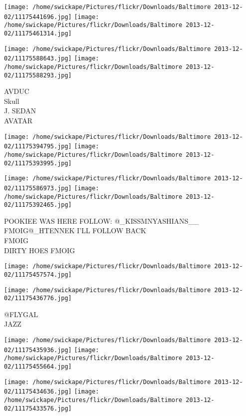 \documentclass[10pt,letterpaper]{article}
\begin{document}
\texttt{[image: /home/swickape/Pictures/flickr/Downloads/Baltimore 2013-12-02/11175441696.jpg]}
\texttt{[image: /home/swickape/Pictures/flickr/Downloads/Baltimore 2013-12-02/11175461314.jpg]}

\texttt{[image: /home/swickape/Pictures/flickr/Downloads/Baltimore 2013-12-02/11175588643.jpg]}
\texttt{[image: /home/swickape/Pictures/flickr/Downloads/Baltimore 2013-12-02/11175588293.jpg]}

AVDUC\\
Skull\\
J. SEDAN\\
AVATAR\\
\pagebreak

\texttt{[image: /home/swickape/Pictures/flickr/Downloads/Baltimore 2013-12-02/11175394795.jpg]}
\texttt{[image: /home/swickape/Pictures/flickr/Downloads/Baltimore 2013-12-02/11175393995.jpg]}

\texttt{[image: /home/swickape/Pictures/flickr/Downloads/Baltimore 2013-12-02/11175586973.jpg]}
\texttt{[image: /home/swickape/Pictures/flickr/Downloads/Baltimore 2013-12-02/11175392465.jpg]}

POOKIEE WAS HERE FOLLOW: @\_KISSMNYASHIANS\_\_\\
FMOIG@\_HTENNEK I'LL FOLLOW BACK\\
FMOIG\\
DIRTY HOES FMOIG\\
\pagebreak

\texttt{[image: /home/swickape/Pictures/flickr/Downloads/Baltimore 2013-12-02/11175457574.jpg]}

\vspace{0.25in}
\texttt{[image: /home/swickape/Pictures/flickr/Downloads/Baltimore 2013-12-02/11175436776.jpg]}

@FLYGAL\\
JAZZ\\
\pagebreak

\texttt{[image: /home/swickape/Pictures/flickr/Downloads/Baltimore 2013-12-02/11175435936.jpg]}
\texttt{[image: /home/swickape/Pictures/flickr/Downloads/Baltimore 2013-12-02/11175455664.jpg]}

\texttt{[image: /home/swickape/Pictures/flickr/Downloads/Baltimore 2013-12-02/11175434636.jpg]}
\texttt{[image: /home/swickape/Pictures/flickr/Downloads/Baltimore 2013-12-02/11175433576.jpg]}
\end{document}
